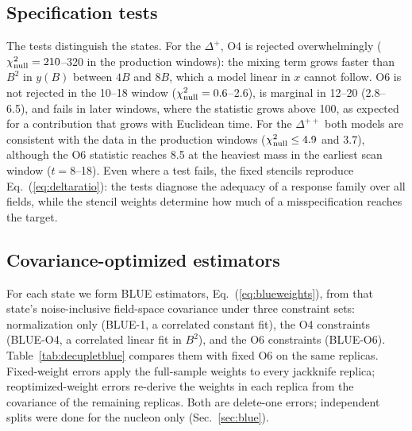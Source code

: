 \documentclass[aps,prd,reprint,twocolumn,superscriptaddress,nofootinbib,longbibliography]{revtex4-2}
\begin{document}
\subsection{Specification tests}

The tests distinguish the states. For the $\Delta^+$, O4 is rejected overwhelmingly ($\chi^2_{\rm null}=210$--320 in the production windows): the mixing term grows faster than $B^2$ in $y(B)$ between $4B$ and $8B$, which a model linear in $x$ cannot follow. O6 is not rejected in the 10--18 window ($\chi^2_{\rm null}=0.6$--2.6), is marginal in 12--20 (2.8--6.5), and fails in later windows, where the statistic grows above 100, as expected for a contribution that grows with Euclidean time. For the $\Delta^{++}$ both models are consistent with the data in the production windows ($\chi^2_{\rm null}\le4.9$ and 3.7), although the O6 statistic reaches 8.5 at the heaviest mass in the earliest scan window ($t=8$--18). Even where a test fails, the fixed stencils reproduce Eq.~(\ref{eq:deltaratio}): the tests diagnose the adequacy of a response family over all fields, while the stencil weights determine how much of a misspecification reaches the target.

\subsection{Covariance-optimized estimators}

For each state we form BLUE estimators, Eq.~(\ref{eq:blueweights}), from that state's noise-inclusive field-space covariance under three constraint sets: normalization only (BLUE-1, a correlated constant fit), the O4 constraints (BLUE-O4, a correlated linear fit in $B^2$), and the O6 constraints (BLUE-O6). Table~\ref{tab:decupletblue} compares them with fixed O6 on the same replicas. Fixed-weight errors apply the full-sample weights to every jackknife replica; reoptimized-weight errors re-derive the weights in each replica from the covariance of the remaining replicas. Both are delete-one errors; independent splits were done for the nucleon only (Sec.~\ref{sec:blue}).
\end{document}
